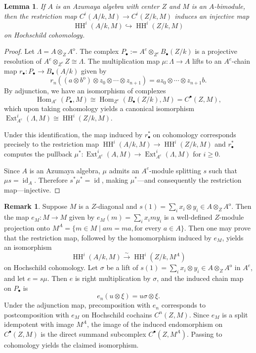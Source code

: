 \documentclass[a4paper,11pt,reqno]{amsart}%
\newtheorem{lemma}[theorem]{Lemma}
\theoremstyle{definition}
\newtheorem{remark}[theorem]{Remark}
\newcommand{\HH}{\operatorname{HH}}
\newcommand{\Hom}{\operatorname{Hom}}
\newcommand{\op}{{\operatorname{o}}}
\newcommand{\Ext}{\operatorname{Ext}}
\newcommand{\id}{\operatorname{id}}
\newcommand{\<}{\<}
\renewcommand{\>}{\>}
\numberwithin{equation}{subsection}
\begin{document}
\begin{lemma}\label{lemma:restriction}
If $A$ is an Azumaya algebra with center $Z$ and
$M$ is an $A$-bimodule, then
the restriction map $C^i(A/k, M) \rightarrow C^i(Z/k, M)$ induces an 
injective map
$$
\HH^i(A/k,M) \hookrightarrow 
\HH^i(Z/k,M)
$$
on Hochschild cohomology.
\end{lemma}
\begin{proof}
Let $\Lambda = A\otimes_Z A^\op$. The complex $P_\bullet := A^e\otimes_{Z^e} B_{\bullet}(Z/k)$ is a projective resolution of $A^e\otimes_{Z^e} Z \cong \Lambda$. The multiplication map $\mu: \Lambda \rightarrow A$ lifts to an $A^e$-chain map $r_\bullet: P_\bullet \rightarrow B_\bullet(A/k)$ given by
$$
r_n((a\otimes b^\op)\otimes z_0 \otimes \cdots \otimes z_{n+1}) = a z_0\otimes \cdots \otimes z_{n+1}b.
$$
By adjunction, we have an isomorphism of complexes
$$
\Hom_{A^e}(P_\bullet, M) \cong \Hom_{Z^e}(B_\bullet(Z/k), M) = C^\bullet(Z, M),
$$
which upon taking cohomology yields a canonical isomorphism $\Ext^i_{A^e}(\Lambda, M) \cong \HH^i(Z/k, M)$. 

Under this identification, the map induced by $r_\bullet^*$ on cohomology corresponds precisely to the restriction map 
$\HH^i(A/k, M) \rightarrow \HH^i(Z/k, M)$ and $r_\bullet^*$ computes the pullback $\mu^*: \Ext^i_{A^e}(A, M) \rightarrow \Ext^i_{A^e}(\Lambda, M)$
for $i\geq 0$.

Since $A$ is an Azumaya algebra, $\mu$ admits an $A^e$-module splitting $s$ such that $\mu s = \id_A$. Therefore $s^* \mu^* = \id$, making $\mu^*${---}and consequently the restriction map{---}injective.
\end{proof}

\begin{remark}
Suppose $M$ is a $Z$-diagonal and $s(1) = \sum_i x_i \otimes y_i\in A \otimes_Z A^\op$. Then the map $e_M: M \rightarrow M$ given by $e_M(m) = \sum_i x_i m y_i$ 
is a well-defined $Z$-module projection onto $M^A = \{m\in M \mid a m = m a, \text{for every }a\in A\}$. Then one may prove that the restriction map, 
followed by the homomorphism induced by $e_M$, yields an 
isomorphism
$$
\HH^i(A/k, M) \xrightarrow{\sim} \HH^i(Z/k, M^A)
$$
on Hochschild cohomology. Let $\sigma$ be a lift of $s(1) = \sum_i x_i \otimes y_i\in A \otimes_Z A^\op$ in $A^e$, and let $e = s \mu$. Then $e$ is right multiplication by $\sigma$, and the induced chain map on $P_\bullet$ is
$$
e_n(u\otimes \xi) = u \sigma \otimes \xi.
$$
Under the adjunction map, precomposition with $e_n$ corresponds to postcomposition with $e_M$ on Hochschild cochains $C^n(Z, M)$. 
Since $e_M$ is a split idempotent with image $M^A$, the image of the induced 
endomorphism on $C^\bullet(Z, M)$ is the direct summand subcomplex $C^\bullet(Z, M^A)$. Passing to 
cohomology yields the claimed isomorphism.
\end{remark}
\end{document}
